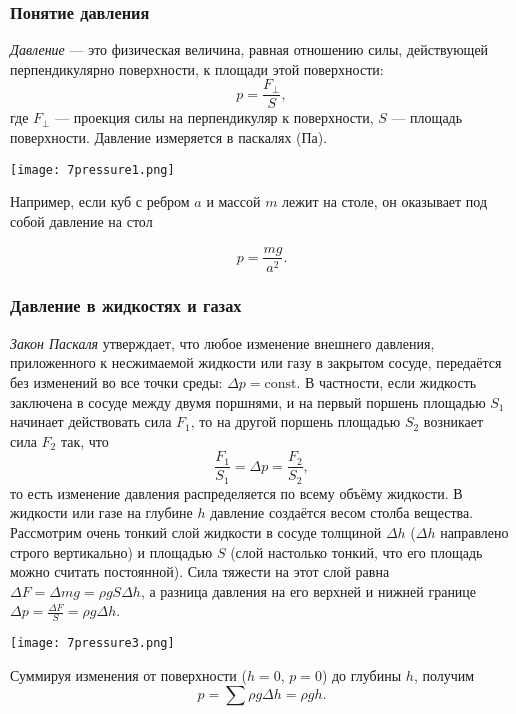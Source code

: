 \documentclass[12pt, a4paper]{article}%
\begin{document}
\subsubsection*{Понятие давления}

\textit{Давление} --- это физическая величина, равная отношению силы, действующей перпендикулярно поверхности, к площади этой поверхности:
\[
p = \frac{F_\perp}{S},
\] где $F_\perp$ — проекция силы на перпендикуляр к поверхности, $S$ — площадь поверхности. Давление измеряется в паскалях (Па).

\begin{center}
\texttt{[image: 7pressure1.png]}
\label{fig:mpr}
\end{center}

Например, если куб с ребром $a$ и массой $m$ лежит на столе, он оказывает под собой давление на стол 





\[
p = \frac{mg}{a^2}.
\]
\subsubsection*{Давление в жидкостях и газах}


\textit{Закон Паскаля} утверждает, что любое изменение внешнего давления, приложенного к несжимаемой жидкости или газу в
закрытом сосуде, передаётся без изменений во все точки среды: $\Delta p = \text{const}$. В частности,
если жидкость заключена в сосуде между двумя поршнями, и на первый поршень площадью $S_1$ начинает действовать сила $F_1$, то на другой поршень площадью $S_2$ возникает сила $F_2$ так, что
\[
\frac{F_1}{S_1} = \Delta p = \frac{F_2}{S_2},
\]
то есть изменение давления распределяется по всему объёму жидкости.
В жидкости или газе на глубине $h$ давление создаётся весом столба вещества. Рассмотрим очень тонкий слой жидкости в сосуде толщиной $\Delta h$ ($\Delta h$ направлено строго вертикально) и площадью $S$ (слой настолько тонкий, что его площадь можно считать постоянной).
Сила тяжести на этот слой равна $\Delta F = \Delta m g = \rho gS\Delta h$, а разница давления на
его верхней и нижней границе $\Delta p = \frac{\Delta F}{S} = \rho g\Delta h$. 

\begin{center}
\texttt{[image: 7pressure3.png]}
\label{fig:mpr}
\end{center}


Суммируя изменения от поверхности ($h=0$, $p=0$) до глубины $h$, получим
\[
p = \sum \rho g\Delta h = \rho g h.
\]
\end{document}
